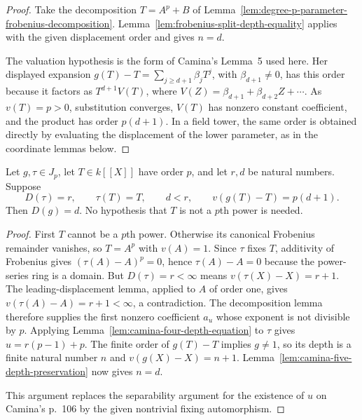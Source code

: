 \begin{proof}
Take the decomposition $T=A^p+B$ of
Lemma~\ref{lem:degree-p-parameter-frobenius-decomposition}.
Lemma~\ref{lem:frobenius-split-depth-equality} applies with the
given displacement order and gives $n=d$.

The valuation hypothesis is the form of Camina's Lemma~5 used here.
Her displayed expansion
$g(T)-T=\sum_{j\ge d+1}\beta_jT^j$, with $\beta_{d+1}\ne0$,
has this order because it factors as $T^{d+1}V(T)$, where
$V(Z)=\beta_{d+1}+\beta_{d+2}Z+\cdots$. As $v(T)=p>0$,
substitution converges, $V(T)$ has nonzero constant coefficient,
and the product has order $p(d+1)$. In a field tower, the same
order is obtained directly by evaluating the displacement of the
lower parameter, as in the coordinate lemmas below.
\end{proof}


\begin{lemma}
\label{lem:nottingham-depth-fixed-parameter}
\leanok
Let $g,\tau\in J_p$, let $T\in k[[X]]$ have order $p$, and
let $r,d$ be natural numbers. Suppose
\[
 D(\tau)=r,\qquad \tau(T)=T,\qquad d<r,\qquad
 v(g(T)-T)=p(d+1).
\]
Then $D(g)=d$. No hypothesis that $T$ is not a $p$th power
is needed.
\end{lemma}

\begin{proof}
First $T$ cannot be a $p$th power. Otherwise its canonical
Frobenius remainder vanishes, so $T=A^p$ with $v(A)=1$.
Since $\tau$ fixes $T$, additivity of Frobenius gives
$(\tau(A)-A)^p=0$, hence $\tau(A)-A=0$ because the
power-series ring is a domain. But $D(\tau)=r<\infty$
means $v(\tau(X)-X)=r+1$. The leading-displacement lemma,
applied to $A$ of order one, gives
$v(\tau(A)-A)=r+1<\infty$, a contradiction.
The decomposition lemma therefore supplies the first nonzero
coefficient $a_u$ whose exponent is not divisible by $p$.
Applying Lemma~\ref{lem:camina-four-depth-equation} to $\tau$
gives $u=r(p-1)+p$.
The finite order of $g(T)-T$ implies $g\ne1$, so its depth
is a finite natural number $n$ and $v(g(X)-X)=n+1$.
Lemma~\ref{lem:camina-five-depth-preservation} now gives $n=d$.

This argument replaces the separability argument for the existence
of $u$ on Camina's p.~106 by the given nontrivial fixing automorphism.
\end{proof}

